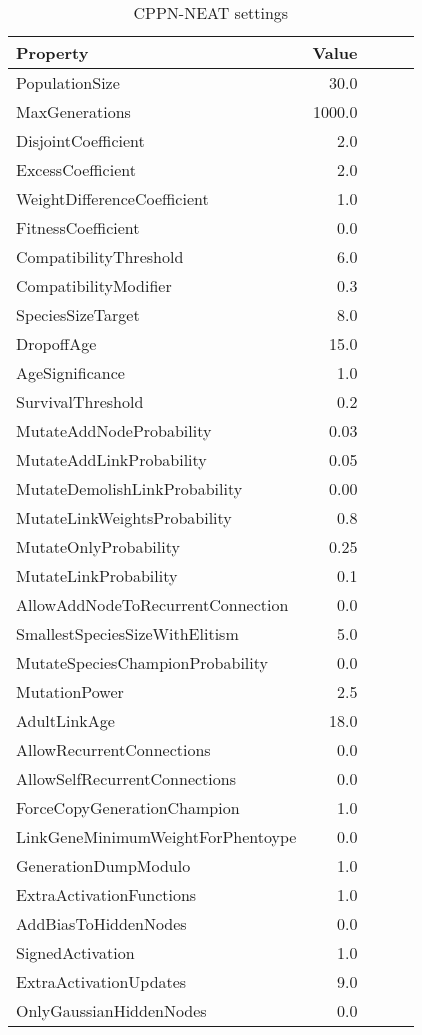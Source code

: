 \begin{table}[ht!]
\centering
\caption{CPPN-NEAT settings}
\label{EvolutionSettings}
    \begin{tabular}{lrrrr}
    \toprule
    \textbf{Property} &  \textbf{Value}\\
    \midrule
    PopulationSize & 30.0\\
    MaxGenerations & 1000.0\\
    DisjointCoefficient & 2.0 \\
    ExcessCoefficient & 2.0 \\
    WeightDifferenceCoefficient & 1.0 \\
    FitnessCoefficient & 0.0 \\
    CompatibilityThreshold & 6.0 \\
    CompatibilityModifier & 0.3 \\
    SpeciesSizeTarget & 8.0 \\
    DropoffAge & 15.0 \\
    AgeSignificance &	1.0 \\
    SurvivalThreshold & 0.2 \\
    MutateAddNodeProbability & 0.03 \\
    MutateAddLinkProbability & 0.05 \\
    MutateDemolishLinkProbability & 0.00 \\
    MutateLinkWeightsProbability & 0.8 \\
    MutateOnlyProbability & 0.25 \\
    MutateLinkProbability & 0.1 \\
    AllowAddNodeToRecurrentConnection & 0.0 \\
    SmallestSpeciesSizeWithElitism & 5.0 \\
    MutateSpeciesChampionProbability & 0.0 \\
    MutationPower & 2.5 \\
    AdultLinkAge & 18.0 \\
    AllowRecurrentConnections & 0.0 \\
    AllowSelfRecurrentConnections & 0.0 \\
    ForceCopyGenerationChampion & 1.0 \\
    LinkGeneMinimumWeightForPhentoype & 0.0 \\
    GenerationDumpModulo & 1.0 \\
    ExtraActivationFunctions & 1.0 \\
    AddBiasToHiddenNodes & 0.0 \\
    SignedActivation & 1.0 \\
    ExtraActivationUpdates & 9.0 \\
    OnlyGaussianHiddenNodes & 0.0 \\
    \bottomrule
    \end{tabular}
\end{table}








